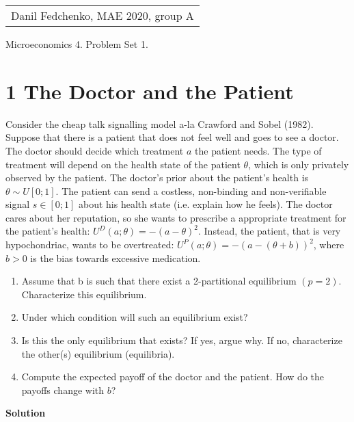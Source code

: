 \documentclass[a4paper]{article}
\begin{document}
	\begin{flushright}
	\begin{tabular}{r}
		Danil Fedchenko, MAE 2020, group A \\
	\end{tabular}
\end{flushright}


\begin{center}
	Microeconomics 4. Problem Set 1.
\end{center}
\section*{1 The Doctor and the Patient}
Consider the cheap talk signalling model a-la Crawford and Sobel (1982). Suppose that
there is a patient that does not feel well and goes to see a doctor. The doctor should
decide which treatment $a$ the patient needs. The type of treatment will depend on
the health state of the patient $\theta$, which is only privately observed by the patient. The
doctor's prior about the patient's health is $\theta \sim U[0; 1]$. The patient can send a costless,
non-binding and non-verifiable signal $s \in [0; 1]$ about his health state (i.e. explain how
he feels). The doctor cares about her reputation, so she wants to prescribe a appropriate
treatment for the patient's health: $U^D(a; \theta) = -(a-\theta)^2$. Instead, the patient, that is
very hypochondriac, wants to be overtreated: $U^P(a; \theta) = -(a - (\theta + b))^2$, where $b > 0$ is
the bias towards excessive medication.
\begin{enumerate}
	\item Assume that b is such that there exist a 2-partitional equilibrium $(p = 2)$. Characterize this equilibrium.
	\item Under which condition will such an equilibrium exist?
	\item Is this the only equilibrium that exists? If yes, argue why. If no, characterize the
	other(s) equilibrium (equilibria).
	\item Compute the expected payoff of the doctor and the patient. How do the payoffs
	change with $b$?
\end{enumerate}

\textbf{Solution}
\end{document}
